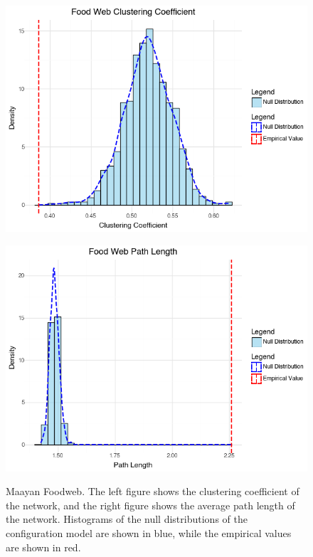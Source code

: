 \documentclass[12pt]{article}
\begin{document}
\begin{figure}[h]
    \centering
    \begin{minipage}{0.45\textwidth}
        \centering
        \includegraphics[width=\textwidth]{../figures/food_clustering.png}
        \label{fig:food_network_clustering}
    \end{minipage}
    \hfill
    \begin{minipage}{0.45\textwidth}
        \centering
        \includegraphics[width=\textwidth]{../figures/food_path.png}
        \label{fig:food_network_pathlength}
    \end{minipage}
    \caption{Maayan Foodweb. The left figure shows the clustering coefficient of the network, and the right figure shows the average path length of the network. Histograms of the null distributions of the configuration model are shown in blue, while the empirical values are shown in red.}
    \label{fig:foodweb_network}
\end{figure}
\end{document}
